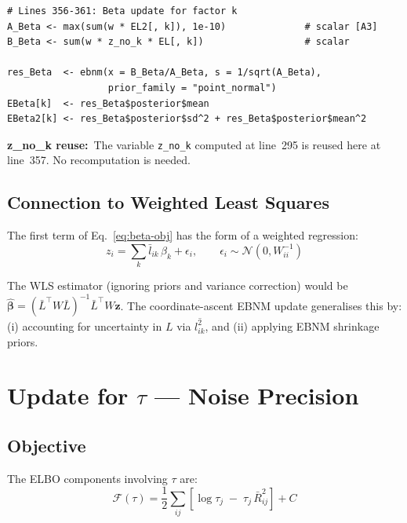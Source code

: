 \documentclass[11pt]{article}
\newcommand{\lbar}[2]{\bar{l}_{#1#2}}
\newcommand{\lsec}[2]{\overline{l^2_{#1#2}}}
\newcommand{\coderef}[1]{{\color{blue!70!black}\texttt{#1}}}
\begin{document}
\begin{codebox}
\begin{lstlisting}[style=Rstyle]
# Lines 356-361: Beta update for factor k
A_Beta <- max(sum(w * EL2[, k]), 1e-10)              # scalar [A3]
B_Beta <- sum(w * z_no_k * EL[, k])                  # scalar

res_Beta  <- ebnm(x = B_Beta/A_Beta, s = 1/sqrt(A_Beta),
                  prior_family = "point_normal")
EBeta[k]  <- res_Beta$posterior$mean
EBeta2[k] <- res_Beta$posterior$sd^2 + res_Beta$posterior$mean^2
\end{lstlisting}
\textbf{z\_no\_k reuse:}\ The variable \coderef{z\_no\_k} computed at
line~295 is reused here at line~357.  No recomputation is needed.
\end{codebox}

\subsection{Connection to Weighted Least Squares}

The first term of Eq.~\eqref{eq:beta-obj} has the form of a weighted regression:
\[
  z_i = \sum_k \lbar{i}{k}\,\beta_k + \epsilon_i,
  \qquad \epsilon_i \sim \mathcal{N}(0, W_{ii}^{-1})
\]

The WLS estimator (ignoring priors and variance correction) would be
$\hat{\bm{\beta}} = (\bar{L}^{\top}W\bar{L})^{-1}\bar{L}^{\top}W\mathbf{z}$.
The coordinate-ascent EBNM update generalises this by:
(i) accounting for uncertainty in $L$ via $\lsec{i}{k}$, and
(ii) applying EBNM shrinkage priors.

\section{Update for \texorpdfstring{$\tau$}{tau} --- Noise Precision}
\label{sec:tau}

\subsection{Objective}

The ELBO components involving $\tau$ are:
\begin{equation}\label{eq:tau-obj}
  \mathcal{F}(\tau) = \frac{1}{2}\sum_{ij}
    \left[\log\tau_j \;-\; \tau_j\,\bar{R}^2_{ij}\right] + C
\end{equation}
\end{document}
